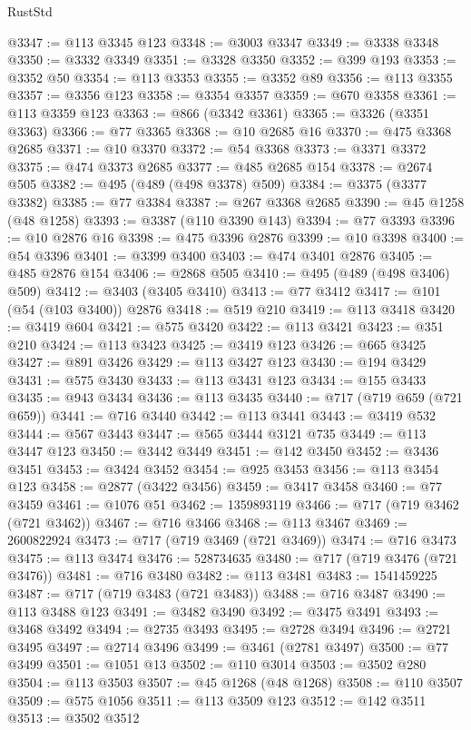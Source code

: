 \begin{lexlean}{RustStd}
\begin{coremodule}
@3347 := @113 @3345 @123
@3348 := @3003 @3347
@3349 := @3338 @3348
@3350 := @3332 @3349
@3351 := @3328 @3350
@3352 := @399 @193
@3353 := @3352 @50
@3354 := @113 @3353
@3355 := @3352 @89
@3356 := @113 @3355
@3357 := @3356 @123
@3358 := @3354 @3357
@3359 := @670 @3358
@3361 := @113 @3359 @123
@3363 := @866 (@3342 @3361)
@3365 := @3326 (@3351 @3363)
@3366 := @77 @3365
@3368 := @10 @2685 @16
@3370 := @475 @3368 @2685
@3371 := @10 @3370
@3372 := @54 @3368
@3373 := @3371 @3372
@3375 := @474 @3373 @2685
@3377 := @485 @2685 @154
@3378 := @2674 @505
@3382 := @495 (@489 (@498 @3378) @509)
@3384 := @3375 (@3377 @3382)
@3385 := @77 @3384
@3387 := @267 @3368 @2685
@3390 := @45 @1258 (@48 @1258)
@3393 := @3387 (@110 @3390 @143)
@3394 := @77 @3393
@3396 := @10 @2876 @16
@3398 := @475 @3396 @2876
@3399 := @10 @3398
@3400 := @54 @3396
@3401 := @3399 @3400
@3403 := @474 @3401 @2876
@3405 := @485 @2876 @154
@3406 := @2868 @505
@3410 := @495 (@489 (@498 @3406) @509)
@3412 := @3403 (@3405 @3410)
@3413 := @77 @3412
@3417 := @101 (@54 (@103 @3400)) @2876
@3418 := @519 @210
@3419 := @113 @3418
@3420 := @3419 @604
@3421 := @575 @3420
@3422 := @113 @3421
@3423 := @351 @210
@3424 := @113 @3423
@3425 := @3419 @123
@3426 := @665 @3425
@3427 := @891 @3426
@3429 := @113 @3427 @123
@3430 := @194 @3429
@3431 := @575 @3430
@3433 := @113 @3431 @123
@3434 := @155 @3433
@3435 := @943 @3434
@3436 := @113 @3435
@3440 := @717 (@719 @659 (@721 @659))
@3441 := @716 @3440
@3442 := @113 @3441
@3443 := @3419 @532
@3444 := @567 @3443
@3447 := @565 @3444 @3121 @735
@3449 := @113 @3447 @123
@3450 := @3442 @3449
@3451 := @142 @3450
@3452 := @3436 @3451
@3453 := @3424 @3452
@3454 := @925 @3453
@3456 := @113 @3454 @123
@3458 := @2877 (@3422 @3456)
@3459 := @3417 @3458
@3460 := @77 @3459
@3461 := @1076 @51
@3462 := 1359893119
@3466 := @717 (@719 @3462 (@721 @3462))
@3467 := @716 @3466
@3468 := @113 @3467
@3469 := 2600822924
@3473 := @717 (@719 @3469 (@721 @3469))
@3474 := @716 @3473
@3475 := @113 @3474
@3476 := 528734635
@3480 := @717 (@719 @3476 (@721 @3476))
@3481 := @716 @3480
@3482 := @113 @3481
@3483 := 1541459225
@3487 := @717 (@719 @3483 (@721 @3483))
@3488 := @716 @3487
@3490 := @113 @3488 @123
@3491 := @3482 @3490
@3492 := @3475 @3491
@3493 := @3468 @3492
@3494 := @2735 @3493
@3495 := @2728 @3494
@3496 := @2721 @3495
@3497 := @2714 @3496
@3499 := @3461 (@2781 @3497)
@3500 := @77 @3499
@3501 := @1051 @13
@3502 := @110 @3014
@3503 := @3502 @280
@3504 := @113 @3503
@3507 := @45 @1268 (@48 @1268)
@3508 := @110 @3507
@3509 := @575 @1056
@3511 := @113 @3509 @123
@3512 := @142 @3511
@3513 := @3502 @3512

\end{coremodule}
\end{lexlean}
